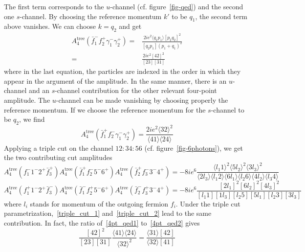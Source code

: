The first term corresponds to the $u$-channel (cf. figure~\ref{fig-qed}) and the second one $s$-channel.
By choosing the reference momentum $k'$ to be $q_1$, the second term above vanishes. 
We can choose $k = q_2$ and get 
\begin{equation}\label{4pt_qed1}
\begin{split}
A_{4}^{\mathrm{tree}}(\bar{f}_1^- f_2^+ \gamma_1^-\gamma_2^+) 
= &
\frac{2ie^2\langle q_1 p_1 \rangle[p_2 q_2]^2}{[q_2 p_1](p_1+q_1)^2}
\\ 
= &
\frac{2ie^2[42]^2}{[23][31]}
\end{split}
\end{equation}
where in the last equation, the particles are indexed in the order in which they appear in the argument of the amplitude.
In the same manner, there is an $u$-channel and an $s$-channel contribution for the other relevant four-point amplitude. 
The $u$-channel can be made vanishing by choosing properly the reference momentum. 
If we choose the reference momentum for the $s$-channel to be $q_2$, we find 
\begin{equation}\label{4pt_qed2}
A_4^{\mathrm{tree}}(\bar{f}_1^+ f_2^- \gamma_1^- \gamma_2^+) = 
\frac{2ie^2\langle 32\rangle^2}{\langle 41 \rangle\langle 24\rangle}
\end{equation}
Applying a triple cut on the channel $12:34:56$ (cf. figure~\ref{fig-6photons}), we get the two contributing cut amplitudes
\begin{equation}\label{triple_cut_1}
A_{4}^{\mathrm{tree}}(f_1^- 1^-2^+\bar{f}_3^+)
A_4^{\mathrm{tree}}(\bar{f}_1^+f_2^-5^-6^+)
A_4^{\mathrm{tree}}(\bar{f}_2^+ f_3^-3^-4^+)
=
-8ie^6\frac{\langle l_1 1\rangle^2 \langle 5l_2 \rangle^2\langle 3l_3\rangle^2}{\langle2 l_3\rangle\langle l_1 2\rangle\langle 6 l_1 \rangle\langle l_2 6\rangle\langle 4 l_2\rangle\langle l_3 4\rangle}
\end{equation}
\begin{equation}\label{triple_cut_2}
A_{4}^{\mathrm{tree}}(f_1^+ 1^-2^+\bar{f}_3^-)
A_4^{\mathrm{tree}}(\bar{f}_1^-f_2^+5^-6^+)
A_4^{\mathrm{tree}}(\bar{f}_2^- f_3^+3^-4^+)
=
-8ie^6\frac{[2l_1]^2[6l_2]^2[4l_3]^2}{[l_1 1 ][1l_3][l_2 5][5l_1][l_2 3][3l_3]}
\end{equation}
where $l_i$ stands for momentum of the outgoing fermion $f_i$.
Under the triple cut parametrization,~\cref{triple_cut_1} and~\cref{triple_cut_2} lead to the same contribution. 
In fact, the ratio of~\cref{4pt_qed1} to~\cref{4pt_qed2} gives
\begin{equation}
\frac{[42]^2}{[23][31]}\frac{\langle 41\rangle\langle 24\rangle}{\langle 32 \rangle^2} = \frac{\langle 31\rangle[42]}{\langle 32 \rangle[41]} 
\end{equation} 
